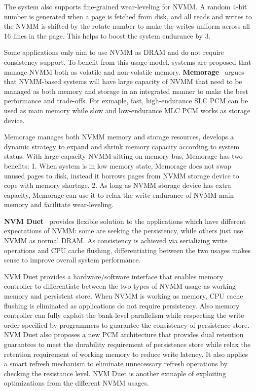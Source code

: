 The system also supports fine-grained wear-leveling for NVMM. A random 4-bit 
number is generated when a page is fetched from disk, and all reads and writes
to the NVMM is shifted by the rotate number to make
the writes uniform across all 16 lines in the page.
This helps to boost the system endurance by 3\x{}.

Some applications only aim to use NVMM as DRAM and do not require consistency
support. To benefit from this usage model, systems are proposed that
manage NVMM both as volatile and non-volatile memory.
\textbf{Memorage}~\cite{memorage} argues that NVMM-based systems will have large
capacity of NVMM that need to be managed as both memory and storage in
an integrated manner to make the best performance and trade-offs. For exmaple,
fast, high-endurance SLC PCM can be used as main memory
while slow and low-endurance MLC PCM works as storage device.

Memorage manages both NVMM memory and storage resources, develops a dynamic
strategy to expand and shrink memory capacity according to system status. 
With large capacity NVMM sitting on memory bus, Memorage has two benefits:
1. When system is in low memory state, Memorage does not swap unused pages
to disk, instead it borrows pages from NVMM storage device to cope with
memory shortage.
2. As long as NVMM storage device has extra capacity, Memorage can use it
to relax the write endurance of NVMM main memory and facilitate wear-leveling.

\textbf{NVM Duet}~\cite{duet} provides flexible solution to the applications
which
have different expectations of NVMM: some are seeking the persistency, while
others just use NVMM as normal DRAM. As consistency is achieved via serializing
write operations and CPU cache flushing, differentiating between the two usages
makes sense to improve overall system performance.

NVM Duet provides a hardware/software interface that enables memory controller
to differentiate between the two types of NVMM usage as working memory and
persistent store. When NVMM is working as memory, CPU cache flushing is
eliminated as applications do not require persistency. Also memory controller
can fully exploit the bank-level parallelism while respecting the write order 
specified by programmers to guarantee the consistency of persistence store.
NVM Duet also proposes a new PCM architecture that provides dual retention
guarantees to meet the durability requirement of persistence store while relax
the retention requirement of working memory to reduce write latency. It also
applies a smart refresh mechanism to eliminate unnecessary refresh operations
by checking the resistance level. NVM Duet is another exmaple of exploiting
optimizations from the different NVMM usages.

